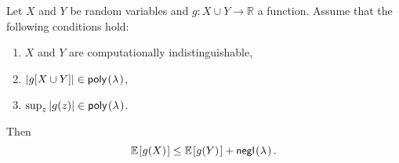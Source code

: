 \begin{corollary} \label{Corollary: computationally indistinguishable expectations}
	Let $X$ and $Y$ be random variables and $g: X \cup Y \rightarrow \mathbb{R}$ a function. Assume that the following conditions hold:
	\begin{enumerate}
		\item $X$ and $Y$ are computationally indistinguishable,
		\item $|g[X \cup Y]| \in \poly$,
		\item $\sup_{z} |g(z)| \in \poly$.
	\end{enumerate}
	Then
	\begin{equation}
	\expect{g(X)} \leq \expect{g(Y)} + \negl.
	\end{equation}
\end{corollary}